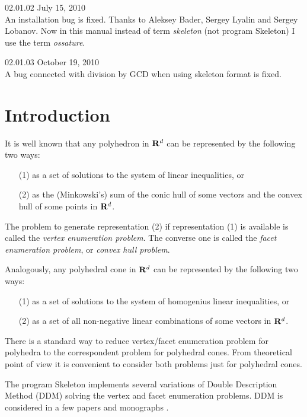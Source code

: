 \documentclass{article}
\newcommand{\Skeleton}{{\sc Skeleton}\xspace}
\newcommand{\params}{\smallskip\hangindent=2\parindent}
\newcommand{\RR}{{\rm\bf R}}
\begin{document}
\params \Skeleton 02.01.02 July 15, 2010\\
      An installation bug is fixed.
      Thanks to Aleksey Bader, Sergey Lyalin and Sergey Lobanov.
      Now in this manual instead of term {\em skeleton} (not program \Skeleton) I use
      the term {\em ossature}.

\params \Skeleton 02.01.03 October 19, 2010\\
      A bug connected with division by GCD when using skeleton format is fixed.


\section{Introduction}

It is well known that any polyhedron in $\RR^d$
can be represented by the following two ways:
\begin{enumerate}
  \item[(1)] as a set of solutions to the system of linear inequalities, or

  \item[(2)] as the (Minkowski's) sum of the conic hull of some vectors and 
                           the convex hull of some points in $\RR^d$.
\end{enumerate}

The problem to generate representation (2) if representation (1) is available
is called the {\em vertex enumeration problem}. The converse one
is called the {\em facet enumeration problem}, or {\em convex hull problem}.

Analogously, any polyhedral cone in $\RR^d$
can be represented by the following two ways:
\begin{enumerate}
  \item[(1)] as a set of solutions to the system of homogenius linear inequalities, or
  \item[(2)] as a set of all non-negative linear combinations of some vectors in $\RR^d$.
\end{enumerate}

There is a standard way to reduce vertex/facet enumeration problem for polyhedra
to the correspondent problem for polyhedral cones. From theoretical point of view
it is convenient to consider both problems just for polyhedral cones. 

The program \Skeleton implements several variations of Double Description
Method (DDM) \cite{MRTT53} solving the vertex and facet enumeration
problems. DDM is considered in a few papers and monographs 
\cite{Burger56,Chernikova64,Chernikova65,Chernikov68,VPSh84,Chernikova68,FQ88,Verge92,FP96,ShCh97,ShG2003}.
\end{document}
